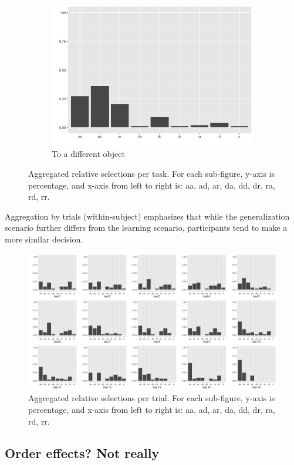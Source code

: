 \documentclass{article}
\begin{document}
\begin{figure}[h!]
\begin{subfigure}[t]{0.25\textwidth}
    \includegraphics[width=\linewidth]{agg_g5} 
    \caption{To a different object} \label{fig:agg_g5}
  \end{subfigure}
  \caption{Aggregated relative selections per task. For each sub-figure, y-axis is percentage, and x-axis from left to right is: aa, ad, ar, da, dd, dr, ra, rd, rr.}
  \label{fig:agg_groups}
\end{figure}

Aggregation by trials (within-subject) emphasizes that while the generalization scenario further differs from the learning scenario, participants tend to make a more similar decision.

\begin{figure}[h!]
  \centering
  \includegraphics[width=.85\linewidth]{agg_trials}
  \caption{Aggregated relative selections per trial. For each sub-figure, y-axis is percentage, and x-axis from left to right is: aa, ad, ar, da, dd, dr, ra, rd, rr.}
\end{figure}

\newpage
\subsection{Order effects? Not really}
\end{document}
